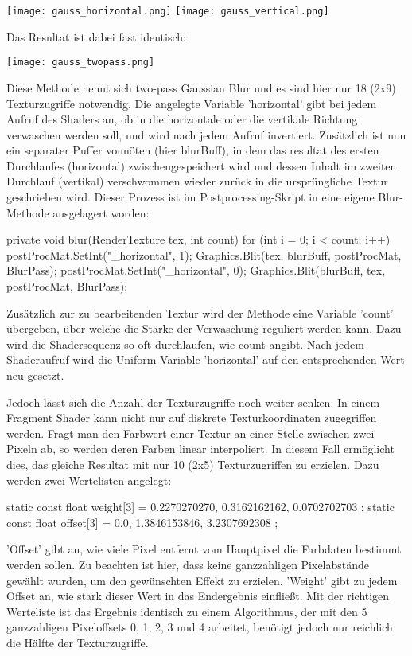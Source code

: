 \texttt{[image: gauss\_horizontal.png]}
\texttt{[image: gauss\_vertical.png]}

Das Resultat ist dabei fast identisch: 

\texttt{[image: gauss\_twopass.png]}

Diese Methode nennt sich two-pass Gaussian Blur und es sind hier nur 18 (2x9) Texturzugriffe notwendig. Die angelegte Variable 'horizontal' gibt bei jedem Aufruf des Shaders an, ob in die horizontale oder die vertikale Richtung verwaschen werden soll, und wird nach jedem Aufruf invertiert. Zusätzlich ist nun ein separater Puffer vonnöten (hier blurBuff), in dem das resultat des ersten Durchlaufes (horizontal) zwischengespeichert wird und dessen Inhalt im zweiten Durchlauf (vertikal) verschwommen wieder zurück in die ursprüngliche Textur geschrieben wird. Dieser Prozess ist im Postprocessing-Skript in eine eigene Blur-Methode ausgelagert worden:

\begin{csh}
private void blur(RenderTexture tex, int count)
{
    for (int i = 0; i < count; i++)
    {
        postProcMat.SetInt("_horizontal", 1);
        Graphics.Blit(tex, blurBuff, postProcMat, BlurPass);
        postProcMat.SetInt("_horizontal", 0);
        Graphics.Blit(blurBuff, tex, postProcMat, BlurPass);
    }
}
\end{csh}

Zusätzlich zur zu bearbeitenden Textur wird der Methode eine Variable 'count' übergeben, über welche die Stärke der Verwaschung reguliert werden kann. Dazu wird die Shadersequenz so oft durchlaufen, wie count angibt. Nach jedem Shaderaufruf wird die Uniform Variable 'horizontal' auf den entsprechenden Wert neu gesetzt.

Jedoch lässt sich die Anzahl der Texturzugriffe noch weiter senken. In einem Fragment Shader kann nicht nur auf diskrete Texturkoordinaten zugegriffen werden. Fragt man den Farbwert einer Textur an einer Stelle zwischen zwei Pixeln ab, so werden deren Farben linear interpoliert. In diesem Fall ermöglicht dies, das gleiche Resultat mit nur 10 (2x5) Texturzugriffen zu erzielen. Dazu werden zwei Wertelisten angelegt:
\begin{hlsl}
    static const float weight[3] = { 0.2270270270, 0.3162162162, 0.0702702703 };
    static const float offset[3] = { 0.0, 1.3846153846, 3.2307692308 };
\end{hlsl}
'Offset' gibt an, wie viele Pixel entfernt vom Hauptpixel die Farbdaten bestimmt werden sollen. Zu beachten ist hier, dass keine ganzzahligen Pixelabstände gewählt wurden, um den gewünschten Effekt zu erzielen.
'Weight' gibt zu jedem Offset an, wie stark dieser Wert in das Endergebnis einflie{\ss}t. Mit der richtigen Werteliste ist das Ergebnis identisch zu einem Algorithmus, der mit den 5 ganzzahligen Pixeloffsets 0, 1, 2, 3 und 4 arbeitet, benötigt jedoch nur reichlich die Hälfte der Texturzugriffe.

